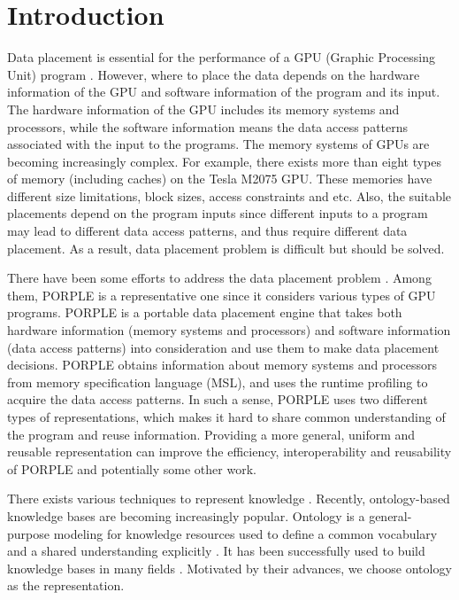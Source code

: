 \documentclass{sig-alternate}
\begin{document}
\section{Introduction}
Data placement is essential for the performance of a GPU (Graphic Processing Unit) program \cite{related1}. However, where to place the data depends on the hardware information of the GPU and software information of the program and its input. The hardware information of the GPU includes its memory systems and processors, while the software information means the data access patterns associated with the input to the programs. The memory systems of GPUs are becoming increasingly complex. For example, there exists more than eight types of memory (including caches) on the Tesla M2075 GPU. These memories have different size limitations, block sizes, access constraints and etc. Also, the suitable placements depend on the program inputs since different inputs to a program may lead to different data access patterns, and thus require different data placement. As a result, data placement problem is difficult but should be solved.

There have been some efforts to address the data placement problem \cite{related1, related2, related3, porple}. Among them, PORPLE \cite{porple} is a representative one since it considers various types of GPU programs. PORPLE is a portable data placement engine that takes both hardware information (memory systems and processors) and software information (data access patterns) into consideration and use them to make data placement decisions. PORPLE obtains information about memory systems and processors from memory specification language (MSL), and uses the runtime profiling to acquire the data access patterns. In such a sense, PORPLE uses two different types of representations, which makes it hard to share common understanding of the program and reuse information. Providing a more general, uniform and reusable representation can improve the efficiency, interoperability and reusability of PORPLE and potentially some other work.

There exists various techniques to represent knowledge \cite{intro2}. Recently, ontology-based knowledge bases are becoming increasingly popular. Ontology is a general-purpose modeling for knowledge resources used to define a common vocabulary and a shared understanding explicitly \cite{ontology1, ontology2}. It has been successfully used to build knowledge bases in many fields \cite{ontology3, ontology4, ontology5, ontology6, work1, work2}. Motivated by their advances, we choose ontology as the representation.
\end{document}
